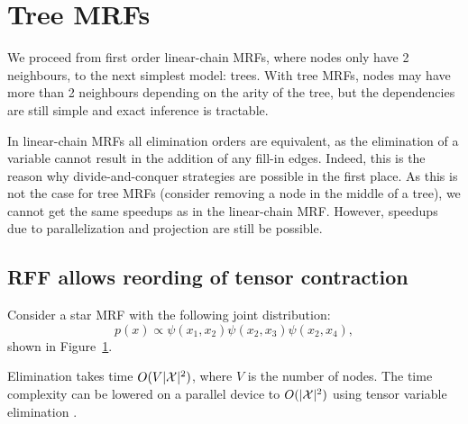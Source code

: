 \documentclass{article}
\begin{document}
\section{Tree MRFs}
We proceed from first order linear-chain MRFs, where nodes only have 2 neighbours,
to the next simplest model: trees.
With tree MRFs, nodes may have more than 2 neighbours depending on the arity of the tree,
but the dependencies are still simple and exact inference is tractable.

In linear-chain MRFs all elimination orders are equivalent, as the elimination 
of a variable cannot result in the addition of any fill-in edges.
Indeed, this is the reason why divide-and-conquer strategies are possible
in the first place.
As this is not the case for tree MRFs (consider removing a node in the middle of a tree),
we cannot get the same speedups as in the linear-chain MRF.
However, speedups due to parallelization and projection are still be possible.

\subsection{RFF allows reording of tensor contraction}
Consider a star MRF with the following joint distribution:
\begin{equation}
p(x) \propto \psi(x_1, x_2) \psi(x_2, x_3) \psi(x_2, x_4),
\end{equation}
shown in Figure~\ref{fig:star-mrf}.
\begin{figure}[htb!]
\centering
{}
\caption{
\label{fig:star-mrf}
}
\end{figure}
Elimination takes time $O(V|\mathcal{X}|^2)$, where $V$ is the number of nodes.
The time complexity can be lowered on a parallel device to $O(|\mathcal{X}|^2)$
using tensor variable elimination \citep{obermeyer2019tve}.
\end{document}
